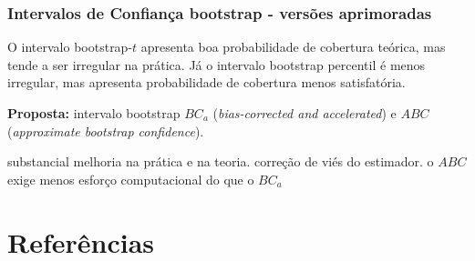 \documentclass[
  letterpaper,
  DIV=11,
  numbers=noendperiod]{scrreprt}
\begin{document}
\subsection{Intervalos de Confiança bootstrap - versões
aprimoradas}\label{intervalos-de-confianuxe7a-bootstrap---versuxf5es-aprimoradas}

O intervalo bootstrap-\(t\) apresenta boa probabilidade de cobertura
teórica, mas tende a ser irregular na prática. Já o intervalo bootstrap
percentil é menos irregular, mas apresenta probabilidade de cobertura
menos satisfatória.

\textbf{Proposta:} intervalo bootstrap \(BC_a\) (\emph{bias-corrected
and accelerated}) e \(ABC\) (\emph{approximate bootstrap confidence}).

substancial melhoria na prática e na teoria. correção de viés do
estimador. o \(ABC\) exige menos esforço computacional do que o \(BC_a\)


\chapter*{Referências}\label{referuxeancias}

\end{document}
